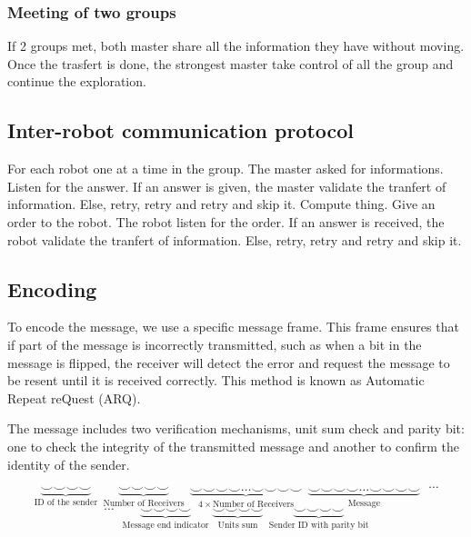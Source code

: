\documentclass[main.tex]{subfiles}
\begin{document}
\subsubsection{Meeting of two groups}

If 2 groups met, both master share all the information they have without moving. Once the trasfert is done, the strongest master take control of all the group and continue the exploration.




\subsection{Inter-robot communication protocol}
For each robot one at a time in the group.
The master asked for informations.
Listen for the answer.
If an answer is given, the master validate the tranfert of information.
Else, retry, retry and retry and skip it.
Compute thing.
Give an order to the robot.
The robot listen for the order.
If an answer is received, the robot validate the tranfert of information.
Else, retry, retry and retry and skip it.

\subsection{Encoding}

To encode the message, we use a specific message frame. This frame ensures that if part of the message is incorrectly transmitted, such as when a bit in the message is flipped, the receiver will detect the error and request the message to be resent until it is received correctly. This method is known as Automatic Repeat reQuest (ARQ).

The message includes two verification mechanisms, unit sum check and parity bit: one to check the integrity of the transmitted message and another to confirm the identity of the sender.

$$
\underbrace{\smallsmile \smallsmile \smallsmile \smallsmile}_{\text{ID of the sender}}~~
\underbrace{\smallsmile \smallsmile \smallsmile \smallsmile}_{\text{Number of Receivers}}~~
\underbrace{\smallsmile \smallsmile \smallsmile \smallsmile \dots \smallsmile \smallsmile \smallsmile \smallsmile}_{4 \times \text{Number of Receivers}}~~
\underbrace{\smallsmile \smallsmile \smallsmile \smallsmile \dots \smallsmile \smallsmile \smallsmile \smallsmile}_{\text{Message}}
~~~ \cdots
$$
$$
\cdots ~~~
\underbrace{\smallsmile \smallsmile \smallsmile \smallsmile}_{\text{Message end indicator}}\;
\underbrace{\smallsmile \smallsmile \smallsmile \smallsmile}_{\text{Units sum}}~~
\underbrace{\smallsmile \smallsmile \smallsmile \smallsmile}_{\text{Sender ID with parity bit}}
$$
\end{document}
